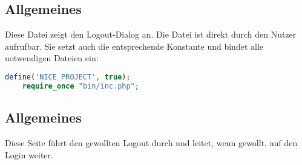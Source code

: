 \subsection{Allgemeines} Diese Datei zeigt den Logout-Dialog an.
Die Datei ist direkt durch den Nutzer aufrufbar. Sie setzt auch die entsprechende Konstante und bindet alle notwendigen Dateien ein:
\begin{lstlisting}[language=php]
	define('NICE_PROJECT', true);
	require_once "bin/inc.php";
\end{lstlisting}
\subsection{Allgemeines}
Diese Seite führt den gewollten Logout durch und leitet, wenn gewollt, auf den Login weiter. 
